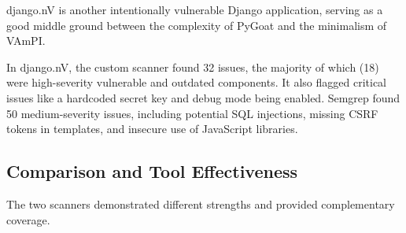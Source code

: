 django.nV is another intentionally vulnerable Django application, serving as a good middle ground between the complexity of PyGoat and the minimalism of VAmPI.

\begin{table}[h!]
\centering
\caption{Vulnerabilities Identified in django.nV}
\label{tab:djangonv_vulns}
\end{table}

In django.nV, the custom scanner found 32 issues, the majority of which (18) were high-severity vulnerable and outdated components. It also flagged critical issues like a hardcoded secret key and debug mode being enabled. Semgrep found 50 medium-severity issues, including potential SQL injections, missing CSRF tokens in templates, and insecure use of JavaScript libraries.

\subsection{Comparison and Tool Effectiveness}

The two scanners demonstrated different strengths and provided complementary coverage.

